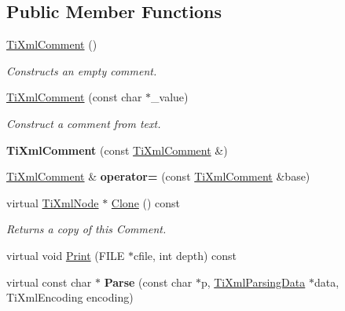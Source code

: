 \subsection*{\-Public \-Member \-Functions}
\begin{DoxyCompactItemize}
\item 
\hypertarget{class_ti_xml_comment_aaa3252031d3e8bd3a2bf51a1c61201b7}{\hyperlink{class_ti_xml_comment_aaa3252031d3e8bd3a2bf51a1c61201b7}{\-Ti\-Xml\-Comment} ()}\label{class_ti_xml_comment_aaa3252031d3e8bd3a2bf51a1c61201b7}

\begin{DoxyCompactList}\small\item\em \-Constructs an empty comment. \end{DoxyCompactList}\item 
\hypertarget{class_ti_xml_comment_a37e7802ef17bc03ebe5ae79bf0713d47}{\hyperlink{class_ti_xml_comment_a37e7802ef17bc03ebe5ae79bf0713d47}{\-Ti\-Xml\-Comment} (const char $\ast$\-\_\-value)}\label{class_ti_xml_comment_a37e7802ef17bc03ebe5ae79bf0713d47}

\begin{DoxyCompactList}\small\item\em \-Construct a comment from text. \end{DoxyCompactList}\item 
\hypertarget{class_ti_xml_comment_afaec41ac2760ce946ba1590eb5708e50}{{\bfseries \-Ti\-Xml\-Comment} (const \hyperlink{class_ti_xml_comment}{\-Ti\-Xml\-Comment} \&)}\label{class_ti_xml_comment_afaec41ac2760ce946ba1590eb5708e50}

\item 
\hypertarget{class_ti_xml_comment_aeceedc15f8b8f9ca0b6136696339b3ac}{\hyperlink{class_ti_xml_comment}{\-Ti\-Xml\-Comment} \& {\bfseries operator=} (const \hyperlink{class_ti_xml_comment}{\-Ti\-Xml\-Comment} \&base)}\label{class_ti_xml_comment_aeceedc15f8b8f9ca0b6136696339b3ac}

\item 
\hypertarget{class_ti_xml_comment_a4f6590c9c9a2b63a48972655b78eb853}{virtual \hyperlink{class_ti_xml_node}{\-Ti\-Xml\-Node} $\ast$ \hyperlink{class_ti_xml_comment_a4f6590c9c9a2b63a48972655b78eb853}{\-Clone} () const }\label{class_ti_xml_comment_a4f6590c9c9a2b63a48972655b78eb853}

\begin{DoxyCompactList}\small\item\em \-Returns a copy of this \-Comment. \end{DoxyCompactList}\item 
virtual void \hyperlink{class_ti_xml_comment_a17398061d62c470f57801ce28fa33ad4}{\-Print} (\-F\-I\-L\-E $\ast$cfile, int depth) const 
\item 
\hypertarget{class_ti_xml_comment_a43bddc18ac057734b41d84653b71d3e0}{virtual const char $\ast$ {\bfseries \-Parse} (const char $\ast$p, \hyperlink{class_ti_xml_parsing_data}{\-Ti\-Xml\-Parsing\-Data} $\ast$data, \-Ti\-Xml\-Encoding encoding)}\label{class_ti_xml_comment_a43bddc18ac057734b41d84653b71d3e0}


\end{DoxyCompactItemize}
